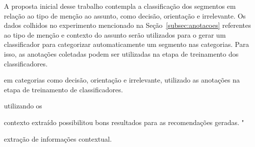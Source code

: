 




































A proposta inicial desse trabalho contempla a classificação dos segmentos em relação ao tipo de menção ao assunto, como decisão, orientação e irrelevante. Os dados colhidos no experimento mencionado na Seção~\ref{subsec:anotacoes} referentes ao tipo de menção e contexto do assunto serão utilizados para o gerar um classificador para categorizar automaticamente um segmento nas categorias. Para isso, as anotações coletadas podem ser utilizadas na etapa de treinamento dos classificadores.


em categorias como decisão, orientação e irrelevante, utilizado as anotações na etapa de treinamento de classificadores.





utilizando os 



















contexto extraído possibilitou bons resultados para as recomendações geradas. "



extração de informações contextual. 


















